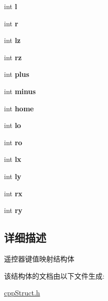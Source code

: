 \begin{DoxyCompactItemize}
\item 
\mbox{\label{structxbox__map__t_a09b84da16711706cafc89d7a2d2cda94}} 
int {\bfseries l}
\item 
\mbox{\label{structxbox__map__t_a4bf5d1b9e65313dc514de601e995a587}} 
int {\bfseries r}
\item 
\mbox{\label{structxbox__map__t_a6707785300a3bc277231084b865ca1a0}} 
int {\bfseries lz}
\item 
\mbox{\label{structxbox__map__t_a9e72e9ae97fb240cb37c35074335e8d1}} 
int {\bfseries rz}
\item 
\mbox{\label{structxbox__map__t_a4c628a2ee2d22022b6fd33fffbde389a}} 
int {\bfseries plus}
\item 
\mbox{\label{structxbox__map__t_a630c9bdfeb0845396f9c78375b6e0949}} 
int {\bfseries minus}
\item 
\mbox{\label{structxbox__map__t_a54130f122919eb9b907097fc34f48747}} 
int {\bfseries home}
\item 
\mbox{\label{structxbox__map__t_a4c6acf095d0a1cb386d0a591dfd306fa}} 
int {\bfseries lo}
\item 
\mbox{\label{structxbox__map__t_a0da513cd35057267b9ff24db75422e94}} 
int {\bfseries ro}
\item 
\mbox{\label{structxbox__map__t_a7c23bdc6de736c19d4308f2fd78556f8}} 
int {\bfseries lx}
\item 
\mbox{\label{structxbox__map__t_af8a620bc72cbb36ba389624f0970db12}} 
int {\bfseries ly}
\item 
\mbox{\label{structxbox__map__t_afb9a695c1a1c076d164e29dd6ab837d7}} 
int {\bfseries rx}
\item 
\mbox{\label{structxbox__map__t_ab42a0dd8e2be3d869754082e1410ca76}} 
int {\bfseries ry}
\end{DoxyCompactItemize}


\subsection{详细描述}
遥控器键值映射结构体 

该结构体的文档由以下文件生成\+:\begin{DoxyCompactItemize}
\item 
\hyperlink{cppStruct_8h}{cpp\+Struct.\+h}\end{DoxyCompactItemize}
